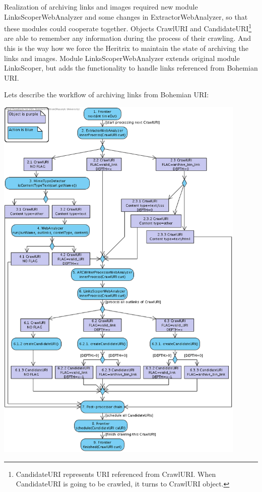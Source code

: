 \documentclass[11pt,a4paper]{article}
\begin{document}
Realization of archiving links and images required new module Links\-ScoperWebAnalyzer and some changes in ExtractorWebAnalyzer, so that these modules could cooperate together. Objects CrawlURI and CandidateURI\footnote{CandidateURI represents URI referenced from CrawlURI. When CandidateURI is going to be crawled, it turns to CrawlURI object.} are able to remember any information during the process of their crawling. And this is the way how we force the Heritrix to maintain the state of archiving the links and images. Module LinksScoperWebAnalyzer extends original module LinksScoper, but adds the functionality to handle links referenced from Bohemian URI.

Lets describe the workflow of archiving links from Bohemian URI:

\begin{center}
\includegraphics[width=120mm]{archiveLinks.png}
\end{center}
\end{document}
